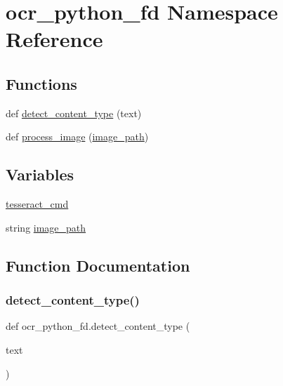 \hypertarget{namespaceocr__python__fd}{}\section{ocr\+\_\+python\+\_\+fd Namespace Reference}
\label{namespaceocr__python__fd}
\subsection*{Functions}
\begin{DoxyCompactItemize}
\item 
def \hyperlink{namespaceocr__python__fd_ab6b80da632babcb25ea1706c6c44304c}{detect\+\_\+content\+\_\+type} (text)
\item 
def \hyperlink{namespaceocr__python__fd_a6e55da31f8cf94a1054d8566f34fa1e1}{process\+\_\+image} (\hyperlink{namespaceocr__python__fd_a157b977803fd2c2a8970d6dec94daf1c}{image\+\_\+path})
\end{DoxyCompactItemize}
\subsection*{Variables}
\begin{DoxyCompactItemize}
\item 
\hyperlink{namespaceocr__python__fd_aa504a4a9d8b3f232af67a45216c93665}{tesseract\+\_\+cmd}
\item 
string \hyperlink{namespaceocr__python__fd_a157b977803fd2c2a8970d6dec94daf1c}{image\+\_\+path}
\end{DoxyCompactItemize}


\subsection{Function Documentation}
\mbox{\label{namespaceocr__python__fd_ab6b80da632babcb25ea1706c6c44304c}} 
\subsubsection{\texorpdfstring{detect\+\_\+content\+\_\+type()}{detect\_content\_type()}}
{\footnotesize\ttfamily def ocr\+\_\+python\+\_\+fd.\+detect\+\_\+content\+\_\+type (\begin{DoxyParamCaption}\item[{}]{text }\end{DoxyParamCaption})}

